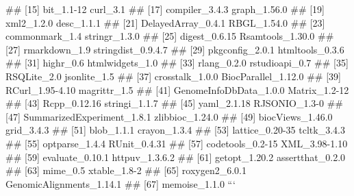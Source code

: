 ## [15] bit_1.1-12                 curl_3.1                  
## [17] compiler_3.4.3             graph_1.56.0              
## [19] xml2_1.2.0                 desc_1.1.1                
## [21] DelayedArray_0.4.1         RBGL_1.54.0               
## [23] commonmark_1.4             stringr_1.3.0             
## [25] digest_0.6.15              Rsamtools_1.30.0          
## [27] rmarkdown_1.9              stringdist_0.9.4.7        
## [29] pkgconfig_2.0.1            htmltools_0.3.6           
## [31] highr_0.6                  htmlwidgets_1.0           
## [33] rlang_0.2.0                rstudioapi_0.7            
## [35] RSQLite_2.0                jsonlite_1.5              
## [37] crosstalk_1.0.0            BiocParallel_1.12.0       
## [39] RCurl_1.95-4.10            magrittr_1.5              
## [41] GenomeInfoDbData_1.0.0     Matrix_1.2-12             
## [43] Rcpp_0.12.16               stringi_1.1.7             
## [45] yaml_2.1.18                RJSONIO_1.3-0             
## [47] SummarizedExperiment_1.8.1 zlibbioc_1.24.0           
## [49] biocViews_1.46.0           grid_3.4.3                
## [51] blob_1.1.1                 crayon_1.3.4              
## [53] lattice_0.20-35            tcltk_3.4.3               
## [55] optparse_1.4.4             RUnit_0.4.31              
## [57] codetools_0.2-15           XML_3.98-1.10             
## [59] evaluate_0.10.1            httpuv_1.3.6.2            
## [61] getopt_1.20.2              assertthat_0.2.0          
## [63] mime_0.5                   xtable_1.8-2              
## [65] roxygen2_6.0.1             GenomicAlignments_1.14.1  
## [67] memoise_1.1.0
```


